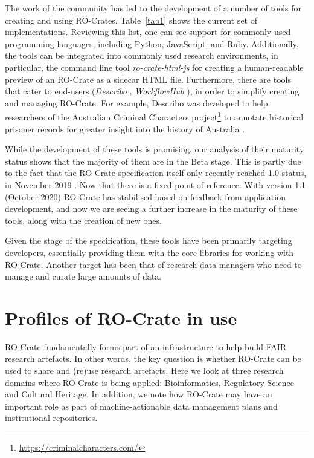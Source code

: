 \documentclass[ds,v1.1.2,openaccess]{iosart2x}%
\begin{document}
The work of the community has led to the development of a number of
tools for creating and using RO-Crates. Table~\ref{tab1} shows the current set
of implementations. Reviewing this list, one can see support for
commonly used programming languages, including Python, JavaScript, and
Ruby. Additionally, the tools can be integrated into commonly used
research environments, in particular, the command line tool
\textit{ro-crate-html-js} \cite{ro-crate-html-js} for creating a human-readable
preview of an RO-Crate as a sidecar HTML file. Furthermore, there are
tools that cater to end-users (\textit{Describo} \cite{describo}, \textit{WorkflowHub}
\cite{about-workflowhub}), in order to simplify creating and managing
RO-Crate. For example, Describo was developed to help researchers of
the Australian Criminal Characters
project\footnote{\url{https://criminalcharacters.com/}} to annotate historical prisoner
records for greater insight into the history of Australia
\cite{doi:10.1080/14490854.2020.1796500}.

While the development of these tools is promising, our analysis of
their maturity status shows that the majority of them are in the Beta
stage. This is partly due to the fact that the RO-Crate specification
itself only recently reached 1.0 status, in November 2019
\cite{doi:10.5281/zenodo.3541888}. Now that there is a fixed point of
reference: With version 1.1 (October 2020)
\cite{doi:10.5281/zenodo.4031327} RO-Crate has stabilised based on feedback
from application development, and now we are seeing a further increase
in the maturity of these tools, along with the creation of new ones.

Given the stage of the specification, these tools have been primarily
targeting developers, essentially providing them with the core
libraries for working with RO-Crate. Another target has been that of
research data managers who need to manage and curate large amounts of data.

\section{Profiles of RO-Crate in use}%

\label{sec:inuse}

RO-Crate fundamentally forms part of an infrastructure to help build
FAIR research artefacts. In other words, the key question is whether
RO-Crate can be used to share and (re)use research artefacts. Here we
look at three research domains where RO-Crate is being applied:
Bioinformatics, Regulatory Science and Cultural Heritage. In addition,
we note how RO-Crate may have an important role as part of
machine-actionable data management plans and institutional repositories.
\end{document}
